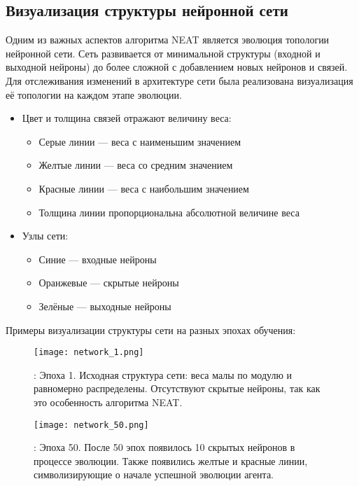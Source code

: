 \documentclass[a4paper,12pt]{article}
\begin{document}
\subsection{Визуализация структуры нейронной сети}

Одним из важных аспектов алгоритма NEAT является эволюция топологии нейронной сети. Сеть развивается от минимальной структуры (входной и выходной нейроны) до более сложной с добавлением новых нейронов и связей. Для отслеживания изменений в архитектуре сети была реализована визуализация её топологии на каждом этапе эволюции.

\begin{itemize}
	\item Цвет и толщина связей отражают величину веса:
	\begin{itemize}
		\item {Серые линии} --- веса с наименьшим значением 
        \item {Желтые линии} --- веса со средним значением
		\item {Красные линии} --- веса с наибольшим значением 
		\item Толщина линии пропорциональна абсолютной величине веса 
	\end{itemize}
	\item Узлы сети:
	\begin{itemize}
		\item {Синие} --- входные нейроны
		\item {Оранжевые} --- скрытые нейроны
		\item {Зелёные} --- выходные нейроны
	\end{itemize}
\end{itemize}

Примеры визуализации структуры сети на разных эпохах обучения:

\begin{figure}[H]
	\centering
	\texttt{[image: network\_1.png]}
	\caption{: Эпоха 1. Исходная структура сети: веса малы по модулю и равномерно распределены. Отсутствуют скрытые нейроны, так как это особенность алгоритма NEAT.}
	\label{fig:best_fitness}
\end{figure}

\begin{figure}[H]
	\centering
	\texttt{[image: network\_50.png]}
	\caption{: Эпоха 50. После 50 эпох появилось 10 скрытых нейронов в процессе эволюции. Также появились желтые и красные линии, символизирующие о начале успешной эволюции агента.}
	\label{fig:best_fitness}
\end{figure}
\end{document}
